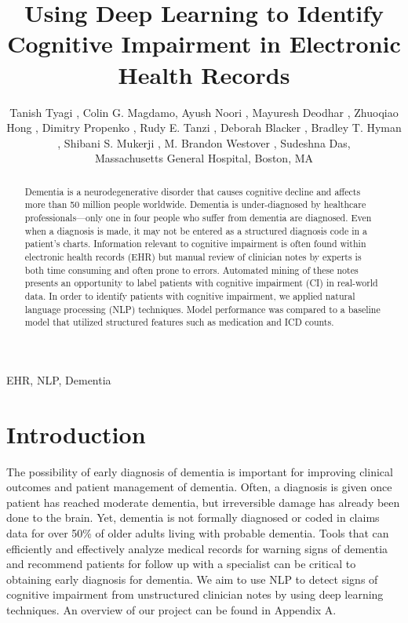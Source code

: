 \documentclass[pmlr,twocolumn,10pt]{jmlr} %
\title[NLP Techniques to Detect Cognitive Impairment]{Using Deep Learning to Identify Cognitive Impairment in Electronic Health Records}
\author{Tanish Tyagi \nametag{\thanks{Authors contributed equally}\SUP{1}},
Colin G. Magdamo\nametag{\footnotemark[1]\SUP{1}}, 
Ayush Noori \SUP{1},
Mayuresh Deodhar \SUP{1},
Zhuoqiao Hong \SUP{1},
Dimitry Propenko \SUP{1},
Rudy E. Tanzi \SUP{1},
Deborah Blacker \SUP{1},
Bradley T. Hyman \SUP{1},
Shibani S. Mukerji \SUP{1},
M. Brandon Westover \SUP{1},
Sudeshna Das\SUP{1},
\centering \Email{
\\[\bigskipamount] 
\SUP{1}\{ttanish, 
cmagdamo,
anoori1,
...
sdas5\}
@mgh.harvard.edu}
% 
\begin{center}\addr Massachusetts General Hospital, Boston, MA\end{center}
}
\begin{document}
\maketitle

\begin{abstract}
\hspace{10mm} Dementia is a neurodegenerative disorder that causes cognitive decline and affects more than 50 million people worldwide. Dementia is under-diagnosed by healthcare professionals—only one in four people who suffer from dementia are diagnosed. Even when a diagnosis is made, it may not be entered as a structured diagnosis code in a patient’s charts.  Information relevant to cognitive impairment is often found within electronic health records (EHR) but manual review of clinician notes by experts is both time consuming and often prone to errors. Automated mining of these notes presents an opportunity to label patients with cognitive impairment (CI) in real-world data. In order to identify patients with cognitive impairment, we applied natural language processing (NLP) techniques. Model performance was compared to a baseline model that utilized structured features such as medication and ICD counts. %
\end{abstract}

\begin{keywords}
EHR, NLP, Dementia
\end{keywords}

\section{Introduction}
\label{sec:intro} The possibility of early diagnosis of dementia is important for improving clinical outcomes and patient management of dementia. Often, a diagnosis is given once patient has reached moderate dementia, but irreversible damage has already been done to the brain. 
Yet, dementia is not formally diagnosed or coded in claims data for over 50\% of older adults living with probable dementia. Tools that can efficiently and effectively analyze medical records for warning signs of dementia and recommend patients for follow up with a specialist can be critical to obtaining early diagnosis for dementia. We aim to use NLP to detect signs of cognitive impairment from unstructured clinician notes by using deep learning techniques. An overview of our project can be found in Appendix A. 
\end{document}
